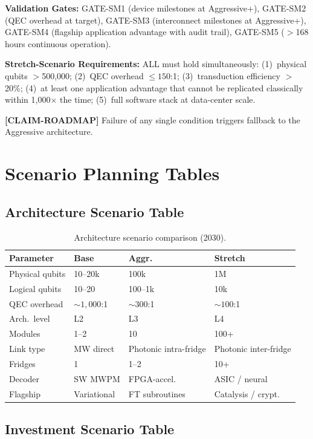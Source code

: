 \documentclass[conference]{IEEEtran}
\begin{document}
\textbf{Validation Gates:} GATE-SM1 (device milestones at Aggressive+), GATE-SM2 (QEC overhead at target), GATE-SM3 (interconnect milestones at Aggressive+), GATE-SM4 (flagship application advantage with audit trail), GATE-SM5 ($>$168 hours continuous operation).

\textbf{Stretch-Scenario Requirements:} ALL must hold simultaneously: (1)~physical qubits $>$500,000; (2)~QEC overhead $\leq 150$:1; (3)~transduction efficiency $>$20\%; (4)~at least one application advantage that cannot be replicated classically within 1,000$\times$ the time; (5)~full software stack at data-center scale.

\textbf{[CLAIM-ROADMAP]} Failure of any single condition triggers fallback to the Aggressive architecture.

\section{Scenario Planning Tables}

\subsection{Architecture Scenario Table}

\begin{table}[H]
\centering
\caption{Architecture scenario comparison (2030).}
\label{tab:arch_scenarios}
\begin{tabular}{@{}l l l l@{}}
\toprule
\textbf{Parameter} & \textbf{Base} & \textbf{Aggr.} & \textbf{Stretch} \\
\midrule
Physical qubits & 10--20k & 100k & 1M \\
Logical qubits & 10--20 & 100--1k & 10k \\
QEC overhead & ${\sim}1{,}000$:1 & ${\sim}300$:1 & ${\sim}100$:1 \\
Arch.\ level & L2 & L3 & L4 \\
Modules & 1--2 & 10 & 100+ \\
Link type & MW direct & Photonic intra-fridge & Photonic inter-fridge \\
Fridges & 1 & 1--2 & 10+ \\
Decoder & SW MWPM & FPGA-accel. & ASIC / neural \\
Flagship & Variational & FT subroutines & Catalysis / crypt. \\
\bottomrule
\end{tabular}
\end{table}

\subsection{Investment Scenario Table}
\end{document}
